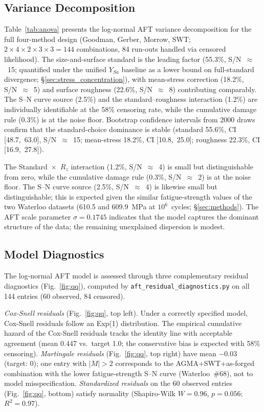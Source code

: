 \documentclass[twocolumn,12pt,a4paper]{article}
\begin{document}
\subsection{Variance Decomposition}

Table~\ref{tab:anova} presents the log-normal AFT variance
decomposition for the full four-method design (Goodman, Gerber,
Morrow, SWT; $2\times4\times2\times3\times3=144$ combinations,
84 run-outs handled via censored likelihood). The size-and-surface
standard is the leading factor (55.3\%, S/N~$\approx$~15; quantified
under the unified $Y_{Sa}$ baseline as a lower bound on full-standard
divergence; \S\ref{sec:stress_concentration}), with mean-stress
correction (18.2\%, S/N~$\approx$~5) and surface roughness (22.6\%,
S/N~$\approx$~8) contributing comparably. The S--N curve source
(2.5\%) and the standard--roughness interaction (1.2\%) are
individually identifiable at the 58\% censoring rate, while the
cumulative damage rule (0.3\%) is at the noise floor. Bootstrap
confidence intervals from 2000 draws confirm that the
standard-choice dominance is stable (standard 55.6\%, CI
[48.7,~63.0], S/N~$\approx$~15; mean-stress 18.2\%, CI
[10.8,~25.0]; roughness 22.3\%, CI [16.9,~27.8]).

The Standard~$\times$~$R_z$ interaction (1.2\%, S/N~$\approx$~4) is
small but distinguishable from zero, while the cumulative damage rule
(0.3\%, S/N~$\approx$~2) is at the noise floor. The S--N curve source
(2.5\%, S/N~$\approx$~4) is likewise small but distinguishable; this
is expected given the similar fatigue-strength values of the two
Waterloo datasets (610.5 and 609.9~MPa at $10^6$~cycles;
\S\ref{sec:methods}). The
AFT scale parameter $\sigma = 0.1745$ indicates that the model
captures the dominant structure of the data; the remaining
unexplained dispersion is modest.

\subsection{Model Diagnostics}

The log-normal AFT model is assessed through three complementary
residual diagnostics (Fig.~\ref{fig:qq}), computed by
\texttt{aft\_residual\_diagnostics.py} on all 144 entries (60
observed, 84 censored).

\textit{Cox-Snell residuals} (Fig.~\ref{fig:qq}, top left). Under a
correctly specified model, Cox-Snell residuals follow an Exp(1)
distribution. The empirical cumulative hazard of the Cox-Snell
residuals tracks the identity line with acceptable agreement (mean
0.447 vs.\ target 1.0; the conservative bias is expected with 58\%
censoring). \textit{Martingale residuals} (Fig.~\ref{fig:qq}, top
right) have mean $-$0.03 (target: 0); one entry with $|M| > 2$
corresponds to the AGMA+SWT+as-forged combination with the lower
fatigue-strength S--N curve (Waterloo~\#68), not to model
misspecification. \textit{Standardized
residuals} on the 60 observed entries (Fig.~\ref{fig:qq}, bottom)
satisfy normality (Shapiro-Wilk $W=0.96$, $p=0.056$; $R^2=0.97$). %
\end{document}
